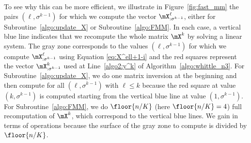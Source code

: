 To see why this can be more efficient, we illustrate in Figure~\ref{fig:fast_mm} the pairs $(\ell,\sigma^{k-1})$ for which we compute the vector $\mX^{\ell}_{: \sigma^{k-1}}$, either for Subroutine~\ref{algo:update_X} or Subroutine~\ref{algo:FMM}.  In each case, a vertical blue line indicates that we recompute the whole matrix $\mX^k$ by solving a linear system.  The gray zone corresponds to the values $(\ell,\sigma^{k-1})$ for which we compute $\mX^\ell_{: \sigma^{k-1}}$ using Equation \eqref{eq:X^ell+1-i} and the red squares represent the vector $\mX^{k}_{: \sigma^{k-1}}$ used at Line~\ref{algo2:y^k} of Algorithm~\ref{algo:whittle_n3}. For Subroutine~\ref{algo:update_X}, we do one matrix inversion at the beginning and then compute for all $(\ell,\sigma^{k-1})$ with $\ell\le k$ because the red square at value $(k,\sigma^{k-1})$ is computed starting from the vertical blue line at value $(1,\sigma^{k-1})$. For Subroutine~\ref{algo:FMM}, we do $ \floor{n/K}$ (here $ \floor{n/K} =4$) full recomputation of $\mX^k$, which correspond to the vertical blue lines. We gain in terms of operations because the surface of the gray zone to compute is divided by $ \floor{n/K} $.


